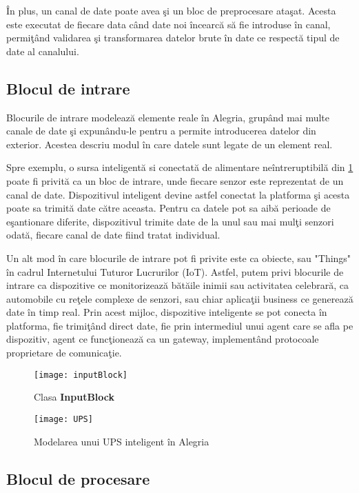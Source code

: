 În plus, un canal de date poate avea şi un bloc de preprocesare ataşat. Acesta este executat de fiecare data când date noi încearcă să fie introduse în canal, permiţând validarea şi transformarea datelor brute în date ce respectă tipul de date al canalului.  
\subsection{Blocul de intrare}
Blocurile de intrare modelează elemente reale în Alegria, grupând mai multe canale de date şi expunându-le pentru a permite introducerea datelor din exterior. Acestea descriu modul în care datele sunt legate de un element real. 

Spre exemplu, o sursa inteligentă si conectată de alimentare neîntreruptibilă din \cref{fig:ups} poate fi privită ca un bloc de intrare, unde fiecare senzor este reprezentat de un canal de date. Dispozitivul inteligent devine astfel conectat la platforma şi acesta poate sa trimită date către aceasta. Pentru ca datele pot sa aibă perioade de eşantionare diferite, dispozitivul trimite date de la unul sau mai mulţi senzori odată, fiecare canal de date fiind tratat individual.

Un alt mod în care blocurile de intrare pot fi privite este ca obiecte, sau "Things" în cadrul Internetului Tuturor Lucrurilor (IoT). Astfel, putem privi blocurile de intrare ca dispozitive ce monitorizează bătăile inimii sau activitatea celebrară, ca automobile cu reţele complexe de senzori, sau chiar aplicaţii business ce generează date în timp real. Prin acest mijloc, dispozitive inteligente se pot conecta în platforma, fie trimiţând direct date, fie prin intermediul unui agent care se afla pe dispozitiv, agent ce funcţionează ca un gateway, implementând protocoale proprietare de comunicaţie.

\begin{figure}[H]
	\centering
	\texttt{[image: inputBlock]}
	\caption{Clasa \textbf{InputBlock}}
\end{figure}
\begin{figure}[H]
	\centering
	\texttt{[image: UPS]}
	\caption{Modelarea unui UPS inteligent în Alegria}
	\label{fig:ups}
\end{figure}

\subsection{Blocul de procesare}

